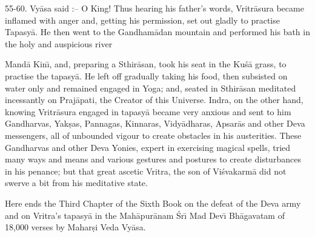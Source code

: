 55-60. Vy\=asa said :-- O King! Thus hearing his father's words, Vritr\=asura became inflamed with anger and, getting his permission, set out gladly to practise Tapasy\=a. He then went to the Gandham\=adan mountain and performed his bath in the holy and auspicious river

Mand\=a Kin\={\i}, and, preparing a Sthir\=asan, took his seat in the Ku\'s\=a grass, to practise the tapasy\=a. He left off gradually taking his food, then subsisted on water only and remained engaged in Yoga; and, seated in Sthir\=asan meditated incessantly on Praj\=apati, the Creator of this Universe. Indra, on the other hand, knowing Vritr\=asura engaged in tapasy\=a became very anxious and sent to him Gandharvas, Yak\d{s}as, Pannagas, Kinnaras, Vidy\=adharas, Apsar\=as and other Deva messengers, all of unbounded vigour to create obstacles in his austerities. These Gandharvas and other Deva Yonies, expert in exercising magical spells, tried many ways and means and various gestures and postures to create disturbances in his penance; but that great ascetic Vritra, the son of Vi\'svakarm\=a did not swerve a bit from his meditative state.

Here ends the Third Chapter of the Sixth Book on the defeat of the Deva army and on Vritra's tapasy\=a in the Mah\=apur\=anam \'Sr\={\i} Mad Dev\={\i} Bh\=agavatam of 18,000 verses by Mahar\d{s}i Veda Vy\=asa.



